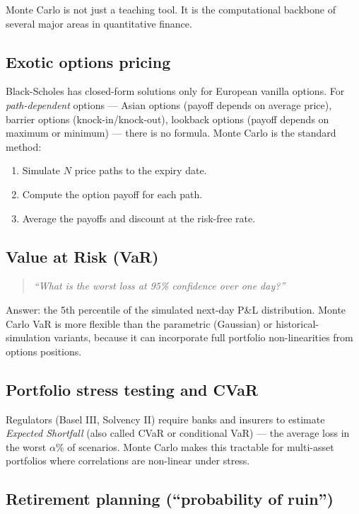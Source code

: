 \documentclass[11pt, a4paper]{article}
\begin{document}
Monte Carlo is not just a teaching tool. It is the computational backbone of several major areas in quantitative finance.

\subsection*{Exotic options pricing}

Black-Scholes has closed-form solutions only for European vanilla options. For \emph{path-dependent} options — Asian options (payoff depends on average price), barrier options (knock-in/knock-out), lookback options (payoff depends on maximum or minimum) — there is no formula. Monte Carlo is the standard method:
\begin{enumerate}[leftmargin=2em]
  \item Simulate $N$ price paths to the expiry date.
  \item Compute the option payoff for each path.
  \item Average the payoffs and discount at the risk-free rate.
\end{enumerate}

\subsection*{Value at Risk (VaR)}

\begin{quote}
\emph{``What is the worst loss at 95\% confidence over one day?''}
\end{quote}
Answer: the 5th percentile of the simulated next-day P\&L distribution. Monte Carlo VaR is more flexible than the parametric (Gaussian) or historical-simulation variants, because it can incorporate full portfolio non-linearities from options positions.

\subsection*{Portfolio stress testing and CVaR}

Regulators (Basel III, Solvency II) require banks and insurers to estimate \emph{Expected Shortfall} (also called CVaR or conditional VaR) — the average loss in the worst $\alpha\%$ of scenarios. Monte Carlo makes this tractable for multi-asset portfolios where correlations are non-linear under stress.

\subsection*{Retirement planning (``probability of ruin'')}
\end{document}
